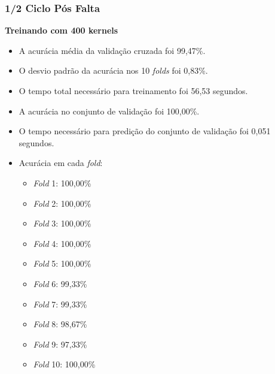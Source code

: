 \subsubsection{1/2 Ciclo Pós Falta}
\textbf{Treinando com 400 kernels}
\begin{itemize}
    \item A acurácia média da validação cruzada foi 99,47\%.
    \item O desvio padrão da acurácia nos 10 \textit{folds} foi 0,83\%.
    \item O tempo total necessário para treinamento foi 56,53 segundos.
    \item A acurácia no conjunto de validação foi 100,00\%.
    \item O tempo necessário para predição do conjunto de validação foi 0,051 segundos.
    \item Acurácia em cada \textit{fold}:
    \begin{itemize}
        \item \textit{Fold} 1: 100,00\%
        \item \textit{Fold} 2: 100,00\%
        \item \textit{Fold} 3: 100,00\%
        \item \textit{Fold} 4: 100,00\%
        \item \textit{Fold} 5: 100,00\%
        \item \textit{Fold} 6: 99,33\%
        \item \textit{Fold} 7: 99,33\%
        \item \textit{Fold} 8: 98,67\%
        \item \textit{Fold} 9: 97,33\%
        \item \textit{Fold} 10: 100,00\%
    \end{itemize}
\end{itemize}

